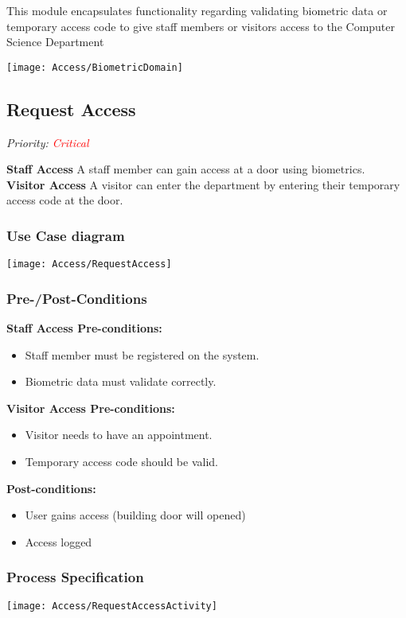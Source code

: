 
This module encapsulates functionality regarding validating biometric data or temporary access code to give staff members or visitors access to the Computer Science Department

\texttt{[image: Access/BiometricDomain]}

\subsection{Request Access}
\textit{ Priority: \textcolor{red}{Critical}} 

\textbf{Staff Access} A staff member can gain access at a door using biometrics. \\
\textbf{Visitor Access} A visitor can enter the department by entering their temporary access code at the door.

\subsubsection{Use Case diagram}
\texttt{[image: Access/RequestAccess]}

\subsubsection{Pre-/Post-Conditions}
\textbf{Staff Access Pre-conditions:} 
	\begin{itemize}
		\item Staff member must be registered on the system.
		\item Biometric data must validate correctly.
	\end{itemize}
\textbf{Visitor Access Pre-conditions:} 
	\begin{itemize}
		\item Visitor needs to have an appointment.
		\item Temporary access code should be valid.
	\end{itemize}
\textbf{ Post-conditions:} 
	\begin{itemize}
		\item User gains access (building door will opened)
		\item Access logged
	\end{itemize}
	
\subsubsection{Process Specification}
	\texttt{[image: Access/RequestAccessActivity]}	

